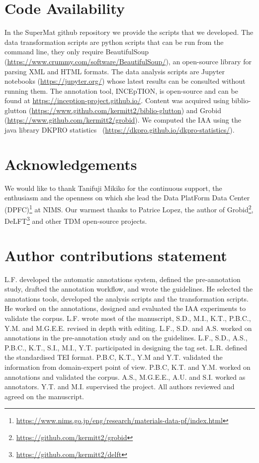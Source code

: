\documentclass[fleqn,10pt]{wlscirep}
\begin{document}
\section*{Code Availability}
\label{sec:code-availability}
In the SuperMat github repository we provide the scripts that we developed. The data transformation scripts are python scripts that can be run from the command line, they only require BeautifulSoup (\url{https://www.crummy.com/software/BeautifulSoup/}), an open-source library for parsing XML and HTML formats. The data analysis scripts are Jupyter notebooks (\url{https://jupyter.org/}) whose latest results can be consulted without running them. 
The annotation tool, INCEpTION, is open-source and can be found at \url{https://inception-project.github.io/}. 
Content was acquired using biblio-glutton (\url{https://www.github.com/kermitt2/biblio-glutton}) and Grobid (\url{https://www.github.com/kermitt2/grobid}).
We computed the IAA using the java library DKPRO statistics~\cite{Meyer2014DKProAA} (\url{https://dkpro.github.io/dkpro-statistics/}).

  

\section*{Acknowledgements}

We would like to thank Tanifuji Mikiko for the continuous support, the enthusiasm and the openness on which she lead the Data PlatForm Data Center (DPFC)\footnote{\url{https://www.nims.go.jp/eng/research/materials-data-pf/index.html}} at NIMS.
Our warmest thanks to Patrice Lopez, the author of Grobid\footnote{\url{https://github.com/kermitt2/grobid}}, DeLFT\footnote{\url{https://github.com/kermitt2/delft}} and other TDM open-source projects. 

\section*{Author contributions statement}

L.F. developed the automatic annotations system, defined the pre-annotation study, drafted the annotation workflow, and wrote the guidelines. 
He selected the annotations tools, developed the analysis scripts and the transformation scripts. 
He worked on the annotations, designed and evaluated the IAA experiments to validate the corpus. 
L.F. wrote most of the manuscript, S.D., M.I., K.T., P.B.C., Y.M. and  M.G.E.E. revised in depth with editing. 
L.F., S.D. and A.S. worked on annotations in the pre-annotation study and on the guidelines. 
L.F., S.D., A.S., P.B.C., K.T., S.I., M.I., Y.T. participated in designing the tag set. 
L.R. defined the standardised TEI format.
P.B.C, K.T., Y.M and Y.T. validated the information from domain-expert point of view.
P.B.C, K.T. and Y.M. worked on annotations and validated the corpus.
A.S., M.G.E.E., A.U. and S.I. worked as annotators. 
Y.T. and M.I. supervised the project. 
All authors reviewed and agreed on the manuscript. 
\end{document}
